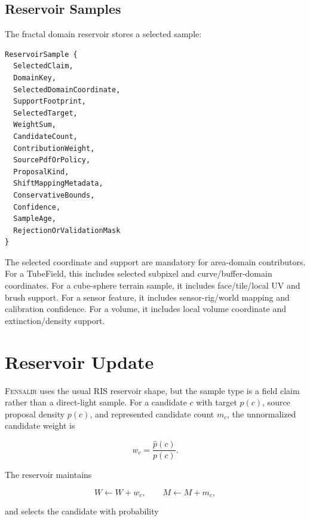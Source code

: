 \documentclass[11pt]{article}
\newcommand{\Fensalir}{\textsc{Fensalir}}
\newcommand{\Target}{\hat{p}}
\newcommand{\Pdf}{p}
\newcommand{\WeightSum}{W}
\begin{document}
\subsection{Reservoir Samples}

The fractal domain reservoir stores a selected sample:

\begin{center}
\begin{minipage}{0.86\linewidth}
\small
\begin{verbatim}
ReservoirSample {
  SelectedClaim,
  DomainKey,
  SelectedDomainCoordinate,
  SupportFootprint,
  SelectedTarget,
  WeightSum,
  CandidateCount,
  ContributionWeight,
  SourcePdfOrPolicy,
  ProposalKind,
  ShiftMappingMetadata,
  ConservativeBounds,
  Confidence,
  SampleAge,
  RejectionOrValidationMask
}
\end{verbatim}
\end{minipage}
\end{center}

The selected coordinate and support are mandatory for area-domain contributors.
For a TubeField, this includes selected subpixel and curve/buffer-domain
coordinates.  For a cube-sphere terrain sample, it includes face/tile/local UV
and brush support.  For a sensor feature, it includes sensor-rig/world mapping
and calibration confidence.  For a volume, it includes local volume coordinate
and extinction/density support.

\section{Reservoir Update}

\Fensalir{} uses the usual RIS reservoir shape, but the sample type is a field
claim rather than a direct-light sample.  For a candidate \(c\) with target
\(\Target(c)\), source proposal density \(\Pdf(c)\), and represented candidate
count \(m_c\), the unnormalized candidate weight is

\begin{equation}
  w_c = \frac{\Target(c)}{\Pdf(c)}.
\end{equation}

The reservoir maintains

\begin{equation}
  \WeightSum \leftarrow \WeightSum + w_c,\qquad
  M \leftarrow M + m_c,
\end{equation}

and selects the candidate with probability
\end{document}
